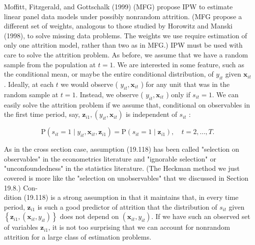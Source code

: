 \documentclass[10pt]{article}
\begin{document}
Moffitt, Fitzgerald, and Gottschalk (1999) (MFG) propose IPW to estimate linear panel data models under possibly nonrandom attrition. (MFG propose a different set of weights, analogous to those studied by Horowitz and Manski (1998), to solve missing data problems. The weights we use require estimation of only one attrition model, rather than two as in MFG.) IPW must be used with care to solve the attrition problem. As before, we assume that we have a random sample from the population at $t=1$. We are interested in some feature, such as the conditional mean, or maybe the entire conditional distribution, of $y_{i t}$ given $\mathbf{x}_{i t}$. Ideally, at each $t$ we would observe ( $y_{i t}, \mathbf{x}_{i t}$ ) for any unit that was in the random sample at $t=1$. Instead, we observe ( $y_{i t}, \mathbf{x}_{i t}$ ) only if $s_{i t}=1$. We can easily solve the attrition problem if we assume that, conditional on observables in the first time period, say, $\mathbf{z}_{i 1},\left(y_{i t}, \mathbf{x}_{i t}\right)$ is independent of $s_{i t}$ :


\begin{equation*}
\mathrm{P}\left(s_{i t}=1 \mid y_{i t}, \mathbf{x}_{i t}, \mathbf{z}_{i 1}\right)=\mathrm{P}\left(s_{i t}=1 \mid \mathbf{z}_{i 1}\right), \quad t=2, \ldots, T . \tag{19.118}
\end{equation*}


As in the cross section case, assumption (19.118) has been called "selection on observables" in the econometrics literature and "ignorable selection" or "unconfoundedness" in the statistics literature. (The Heckman method we just covered is more like the "selection on unobservables" that we discussed in Section 19.8.) Con-\\
dition (19.118) is a strong assumption in that it maintains that, in every time period, $\mathbf{z}_{i 1}$ is such a good predictor of attrition that the distribution of $s_{i t}$ given $\left\{\mathbf{z}_{i 1},\left(\mathbf{x}_{i t}, y_{i t}\right)\right\}$ does not depend on $\left(\mathbf{x}_{i t}, y_{i t}\right)$. If we have such an observed set of variables $\mathbf{z}_{i 1}$, it is not too surprising that we can account for nonrandom attrition for a large class of estimation problems.
\end{document}
